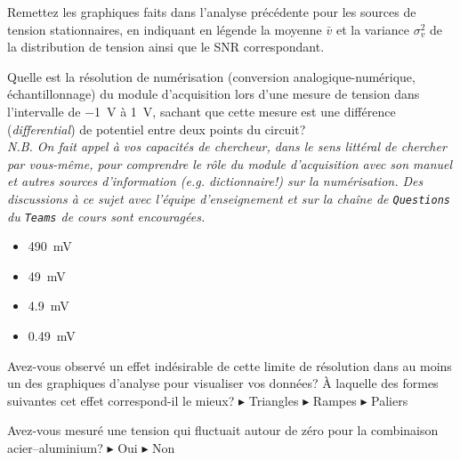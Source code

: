 \documentclass[canadien,12pt,oneside,letterpaper]{article}
\begin{document}
\begin{gradescope}
\item Remettez les graphiques faits dans l'analyse précédente pour les sources de tension stationnaires, en indiquant en légende la moyenne $\bar{v}$ et la variance $\sigma_v^2$ de la distribution de tension ainsi que le SNR correspondant.
    \begin{gradescope}
    \setcounter{gradescopei}{2}
    \item Quelle est la résolution de numérisation (conversion analogique-numérique, échantillonnage) du module d'acquisition lors d'une mesure de tension dans l'intervalle de \qty{-1}{\volt} à \qty{1}{\volt}, sachant que cette mesure est une différence (\textit{differential}) de potentiel entre deux points du circuit?\\ \textit{\footnotesize N.B. On fait appel à vos capacités de chercheur, dans le sens littéral de chercher par vous-même, pour comprendre le rôle du module d'acquisition avec son manuel et autres sources d'information (\emph{e.g.} dictionnaire!) sur la numérisation. Des discussions à ce sujet avec l'équipe d'enseignement et sur la chaîne de \texttt{Questions} du \texttt{Teams} de cours sont encouragées.}
        \begin{itemize}[label=$\blacktriangleright$]
        \item \qty{490}{\mV}
        \item \qty{49}{\mV}
        \item \qty{4.9}{\mV}
        \item \qty{0.49}{\mV}
        \end{itemize}
    \item Avez-vous observé un effet indésirable de cette limite de résolution dans au moins un des graphiques d'analyse pour visualiser vos données? À laquelle des formes suivantes cet effet correspond-il le mieux? $\blacktriangleright$ Triangles $\blacktriangleright$ Rampes $\blacktriangleright$ Paliers
    \end{gradescope}
    \begin{gradescope}
    \setcounter{gradescopei}{3}
    \item Avez-vous mesuré une tension qui fluctuait autour de zéro pour la combinaison acier--aluminium? $\blacktriangleright$ Oui $\blacktriangleright$ Non

\end{gradescope}
\end{gradescope}
\end{document}
